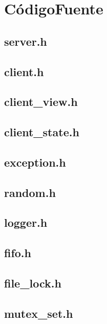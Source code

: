 \section{CódigoFuente}
\subsection*{server.h}
\scriptsize
\subsection*{client.h}
\scriptsize
\subsection*{client_view.h}
\scriptsize
\subsection*{client_state.h}
\scriptsize
\subsection*{exception.h}
\scriptsize
\subsection*{random.h}
\scriptsize
\subsection*{logger.h}
\scriptsize
\subsection*{fifo.h}
\scriptsize
\subsection*{file_lock.h}
\scriptsize
\subsection*{mutex_set.h}
\scriptsize
